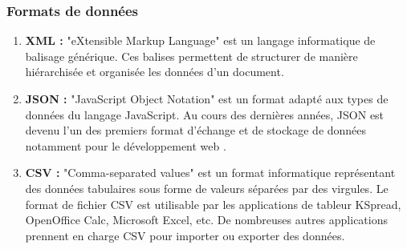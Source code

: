         \subsubsection{Formats de données}
            \begin{enumerate}[leftmargin=*]
                \item{\textbf{XML : }}
                "eXtensible Markup Language" est un langage informatique de balisage générique. Ces balises permettent de structurer de manière hiérarchisée et organisée les données d'un document.\\

                \item{\textbf{JSON : }}
                "JavaScript Object Notation" est un format adapté aux types de données du langage JavaScript. Au cours des dernières années, JSON est devenu l'un des premiers format d'échange et de stockage de données notamment pour le développement web \cite{jsonimpl}.\\
                
                \item{\textbf{CSV : }}
                "Comma-separated values" est un format informatique représentant des données tabulaires sous forme de valeurs séparées par des virgules. Le format de fichier CSV est utilisable par les applications de tableur KSpread, OpenOffice Calc, Microsoft Excel, etc. De nombreuses autres applications prennent en charge CSV pour importer ou exporter des données.\cite{csv}
            \end{enumerate}

